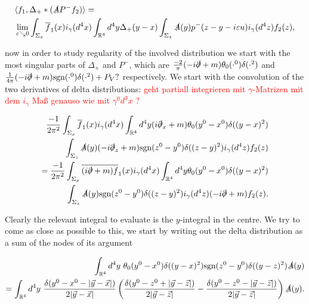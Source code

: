 \documentclass[a4paper,11pt]{article}
\begin{document}
\begin{align}
&\langle f_1, \Delta_+ * (\slashed{A} P^- f_2)\rangle =\\
&\lim_{\varepsilon \searrow 0}\int_{\Sigma_x} \overline{f}_1(x) i_\gamma(d^4 x) \int_{\mathbb{R}^4}d^4y \Delta_+ (y-x)  \int_{\Sigma_z} \slashed{A}(y) p^-(z-y - i \varepsilon u) i_\gamma(d^4z) f_2(z),
\end{align}

now in order to study regularity of the involved distribution we start with the most singular parts of \(\Delta_+\) and \(P^-\), 
which are \(\frac{-2}{\pi}(-i\slashed{\partial}+m)\theta_0(\cdot^0)  \delta(\cdot^2)\) 
and \(\frac{1}{4 \pi}(-i\slashed{\partial}+m) \text{sgn}(\cdot^0) \delta(\cdot^2) + P_V ?\) respectively. 
We start with the convolution of the two derivatives of delta distributions: \textcolor{red}{geht partiall integrieren mit \(\gamma\)-Matrizen mit dem \(i_\gamma\) Maß genauso wie mit \(\gamma^0 d^3 x\) ?}

\begin{align}
\frac{-1}{2 \pi^2}\int_{\Sigma_x} \overline{f}_1(x) i_\gamma(d^4 x) 
\int_{\mathbb{R}^4}d^4y (i\slashed{\partial}_x+m)\theta_0(y^0-x^0)  \delta((y-x)^2) 
\\ \int_{\Sigma_z} \slashed{A}(y) (-i\slashed{\partial}_z+m) \text{sgn}(z^0-y^0) \delta((z-y)^2) i_\gamma(d^4z) f_2(z)\\
=\frac{-1}{2 \pi^2}\int_{\Sigma_x} \overline{(i\slashed{\partial}+m)f}_1(x) i_\gamma(d^4 x) 
\int_{\mathbb{R}^4}d^4y \theta_0(y^0-x^0)  \delta((y-x)^2)\\ 
\int_{\Sigma_z} \slashed{A}(y)  \text{sgn}(z^0-y^0) \delta((z-y)^2) i_\gamma(d^4z) (-i\slashed{\partial}+m) f_2(z).
\end{align}

Clearly the relevant integral to evaluate is the \(y\)-integral in the centre. We try to come as close as possible to this, we
start by writing out the delta distribution as a sum of the nodes of its argument

\begin{align}
\int_{\mathbb{R}^4} d^4 y~ \theta_0(y^0-x^0) \delta((y-x)^2) \text{sgn}(z^0-y^0) \delta((y-z)^2) \slashed{A}(y) \\
=\int_{\mathbb{R}^4} d^4 y~
 \frac{\delta(y^0-x^0 - |\vec{y}-\vec{x}|)}{2|\vec{y}-\vec{x}|}
\left( \frac{\delta(y^0-z^0 + |\vec{y}-\vec{z}|)}{2|\vec{y}-\vec{z}|} - \frac{\delta(y^0-z^0 - |\vec{y}-\vec{z}|)}{2|\vec{y}-\vec{z}|} \right)
\slashed{A}(y) .
\end{align}
\end{document}
